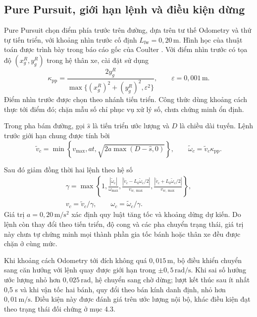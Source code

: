 \documentclass[12pt,a4paper,oneside]{report}
\begin{document}
\subsection{Pure Pursuit, giới hạn lệnh và điều kiện dừng}

Pure Pursuit chọn điểm phía trước trên đường, dựa trên tư thế Odometry và thứ tự tiến triển, với khoảng nhìn trước cố định \(L_{\mathrm{fw}}=0{,}20\,\mathrm{m}\). Hình học của thuật toán được trình bày trong báo cáo gốc của Coulter \cite{coulter-pure-pursuit-1992}. Với điểm nhìn trước có tọa độ \((x_g^R,y_g^R)\) trong hệ thân xe, cài đặt sử dụng
\begin{equation}
  \kappa_{\mathrm{pp}}=
  \frac{2y_g^R}{\max\{(x_g^R)^2+(y_g^R)^2,\varepsilon^2\}},
  \qquad \varepsilon=0{,}001\,\mathrm{m}.
  \label{eq:c4-pure-pursuit}
\end{equation}
Điểm nhìn trước được chọn theo nhánh tiến triển. Công thức dùng khoảng cách thực tới điểm đó; chặn mẫu số chỉ phục vụ xử lý số, chưa chứng minh ổn định.

\begin{samepage}
Trong pha bám đường, gọi \(\widehat s\) là tiến triển ước lượng và \(D\) là chiều dài tuyến. Lệnh trước giới hạn chung được tính bởi
\begin{equation}
  \widetilde v_c=\min\!\left\{v_{\max},at,
                 \sqrt{2a\max(D-\widehat s,0)}\right\},
  \qquad \widetilde\omega_c=\widetilde v_c\kappa_{\mathrm{pp}}.
  \label{eq:c4-speed-law}
\end{equation}
\end{samepage}
Sau đó giảm đồng thời hai lệnh theo hệ số
\begin{equation}
  \begin{aligned}
  \gamma=\max\!\left\{1,\frac{|\widetilde\omega_c|}{\omega_{\max}},
       \frac{|\widetilde v_c-L_0\widetilde\omega_c/2|}{v_{w,\max}},
       \frac{|\widetilde v_c+L_0\widetilde\omega_c/2|}{v_{w,\max}}\right\},\\
  v_c=\widetilde v_c/\gamma,\qquad
  \omega_c=\widetilde\omega_c/\gamma.
  \end{aligned}
  \label{eq:c4-command-scaling}
\end{equation}
Giá trị \(a=0{,}20\,\mathrm{m/s^2}\) xác định quy luật tăng tốc và khoảng dừng dự kiến. Do lệnh còn thay đổi theo tiến triển, độ cong và các pha chuyển trạng thái, giá trị này chưa tự chứng minh mọi thành phần gia tốc bánh hoặc thân xe đều được chặn ở cùng mức.

Khi khoảng cách Odometry tới đích không quá \(0{,}015\,\mathrm{m}\), bộ điều khiển chuyển sang căn hướng với lệnh quay được giới hạn trong \(\pm0{,}5\,\mathrm{rad/s}\). Khi sai số hướng ước lượng nhỏ hơn \(0{,}025\,\mathrm{rad}\), hệ chuyển sang chờ dừng; lượt kết thúc sau ít nhất 0,5 s và khi vận tốc hai bánh, quy đổi theo bán kính danh định, nhỏ hơn \(0{,}01\,\mathrm{m/s}\). Điều kiện này được đánh giá trên ước lượng nội bộ, khác điều kiện đạt theo trạng thái đối chứng ở mục 4.3.
\end{document}
